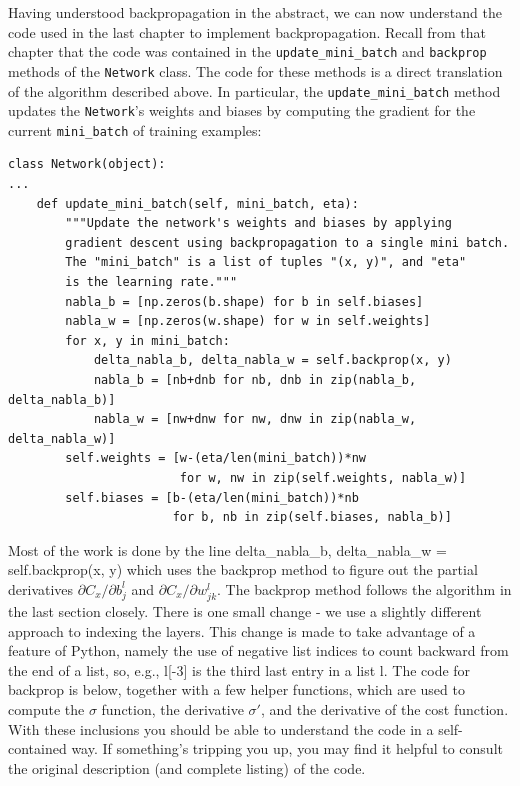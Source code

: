 

Having understood backpropagation in the abstract, we can now understand the code used in the last chapter to implement backpropagation. Recall from that chapter that the code was contained in the \texttt{update\_\allowbreak{}mini\_\allowbreak{}batch} and \texttt{backprop} methods of the \texttt{Network} class. The code for these methods is a direct translation of the algorithm described above. In particular, the \texttt{update\_\allowbreak{}mini\_\allowbreak{}batch} method updates the \texttt{Network}'s weights and biases by computing the gradient for the current \texttt{mini\_\allowbreak{}batch} of training examples:



\begin{lstlisting}
class Network(object):
...
    def update_mini_batch(self, mini_batch, eta):
        """Update the network's weights and biases by applying
        gradient descent using backpropagation to a single mini batch.
        The "mini_batch" is a list of tuples "(x, y)", and "eta"
        is the learning rate."""
        nabla_b = [np.zeros(b.shape) for b in self.biases]
        nabla_w = [np.zeros(w.shape) for w in self.weights]
        for x, y in mini_batch:
            delta_nabla_b, delta_nabla_w = self.backprop(x, y)
            nabla_b = [nb+dnb for nb, dnb in zip(nabla_b, delta_nabla_b)]
            nabla_w = [nw+dnw for nw, dnw in zip(nabla_w, delta_nabla_w)]
        self.weights = [w-(eta/len(mini_batch))*nw 
                        for w, nw in zip(self.weights, nabla_w)]
        self.biases = [b-(eta/len(mini_batch))*nb 
                       for b, nb in zip(self.biases, nabla_b)]

\end{lstlisting}


Most of the work is done by the line delta\_\allowbreak{}nabla\_\allowbreak{}b, delta\_\allowbreak{}nabla\_\allowbreak{}w = self.backprop(x, y) which uses the backprop method to figure out the partial derivatives $\partial C_x / \partial b^l_j$ and $\partial C_x / \partial w^l_{jk}$. The backprop method follows the algorithm in the last section closely. There is one small change - we use a slightly different approach to indexing the layers. This change is made to take advantage of a feature of Python, namely the use of negative list indices to count backward from the end of a list, so, e.g., l[-3] is the third last entry in a list l. The code for backprop is below, together with a few helper functions, which are used to compute the $\sigma$ function, the derivative $\sigma'$, and the derivative of the cost function. With these inclusions you should be able to understand the code in a self-contained way. If something's tripping you up, you may find it helpful to consult the original description (and complete listing) of the code.



